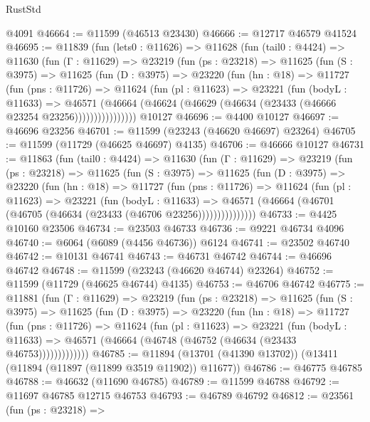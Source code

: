 \begin{lexlean}{RustStd}
\begin{coremodule}
    @4091
@46664 := @11599 (@46513 @23430)
@46666 := @12717 @46579 @41524
@46695 := @11839
    (fun (lets0 : @11626) =>
    @11628
      (fun (tail0 : @4424) =>
      @11630
        (fun (Γ : @11629) =>
        @23219
          (fun (ps : @23218) =>
          @11625
            (fun (S : @3975) =>
            @11625
              (fun (D : @3975) =>
              @23220
                (fun (hn : @18) =>
                @11727
                  (fun (pns : @11726) =>
                  @11624
                    (fun (pl : @11623) =>
                    @23221
                      (fun (bodyL : @11633) =>
                      @46571
                        (@46664
                          (@46624 (@46629 (@46634 (@23433 (@46666 @23254 @23256))))))))))))))))
    @10127
@46696 := @4400 @10127
@46697 := @46696 @23256
@46701 := @11599 (@23243 (@46620 @46697) @23264)
@46705 := @11599 (@11729 (@46625 @46697) @4135)
@46706 := @46666 @10127
@46731 := @11863
    (fun (tail0 : @4424) =>
    @11630
      (fun (Γ : @11629) =>
      @23219
        (fun (ps : @23218) =>
        @11625
          (fun (S : @3975) =>
          @11625
            (fun (D : @3975) =>
            @23220
              (fun (hn : @18) =>
              @11727
                (fun (pns : @11726) =>
                @11624
                  (fun (pl : @11623) =>
                  @23221
                    (fun (bodyL : @11633) =>
                    @46571 (@46664 (@46701 (@46705 (@46634 (@23433 (@46706 @23256)))))))))))))))
@46733 := @4425 @10160 @23506
@46734 := @23503 @46733
@46736 := @9221 @46734 @4096
@46740 := @6064 (@6089 (@4456 @46736)) @6124
@46741 := @23502 @46740
@46742 := @10131 @46741
@46743 := @46731 @46742
@46744 := @46696 @46742
@46748 := @11599 (@23243 (@46620 @46744) @23264)
@46752 := @11599 (@11729 (@46625 @46744) @4135)
@46753 := @46706 @46742
@46775 := @11881
    (fun (Γ : @11629) =>
    @23219
      (fun (ps : @23218) =>
      @11625
        (fun (S : @3975) =>
        @11625
          (fun (D : @3975) =>
          @23220
            (fun (hn : @18) =>
            @11727
              (fun (pns : @11726) =>
              @11624
                (fun (pl : @11623) =>
                @23221
                  (fun (bodyL : @11633) =>
                  @46571 (@46664 (@46748 (@46752 (@46634 (@23433 @46753)))))))))))))
@46785 := @11894 (@13701 (@41390 @13702)) (@13411 (@11894 (@11897 (@11899 @3519 @11902)) @11677))
@46786 := @46775 @46785
@46788 := @46632 (@11690 @46785)
@46789 := @11599 @46788
@46792 := @11697 @46785 @12715 @46753
@46793 := @46789 @46792
@46812 := @23561
    (fun (ps : @23218) =>

\end{coremodule}
\end{lexlean}
